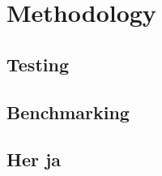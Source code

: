 \documentclass[b5paper]{report}
\theoremstyle{plain}
\theoremstyle{definition}
\begin{document}






\chapter{Methodology}

\section{Testing}

\section{Benchmarking}




\begin{appendices}
  \chapter{Her ja}
\end{appendices}
\end{document}
